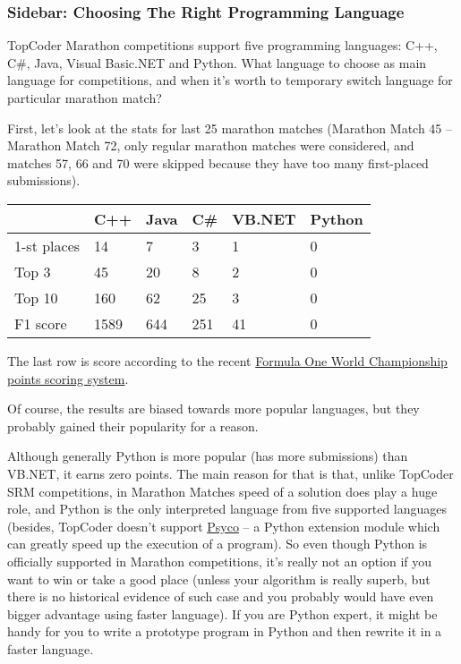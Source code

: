 \hypertarget{sidebar-choosing-the-right-programming-language}{%
\subsubsection{Sidebar: Choosing The Right Programming
Language}\label{sidebar-choosing-the-right-programming-language}}

TopCoder Marathon competitions support five programming languages: C++,
C\#, Java, Visual Basic.NET and Python. What language to choose as main
language for competitions, and when it's worth to temporary switch
language for particular marathon match?

First, let's look at the stats for last 25 marathon matches (Marathon
Match 45 -- Marathon Match 72, only regular marathon matches were
considered, and matches 57, 66 and 70 were skipped because they have too
many first-placed submissions).

\begin{longtable}[]{@{}llllll@{}}
\toprule
& C++ & Java & C\# & VB.NET & Python\tabularnewline
\midrule
\endhead
1-st places & 14 & 7 & 3 & 1 & 0\tabularnewline
Top 3 & 45 & 20 & 8 & 2 & 0\tabularnewline
Top 10 & 160 & 62 & 25 & 3 & 0\tabularnewline
F1 score & 1589 & 644 & 251 & 41 & 0\tabularnewline
\bottomrule
\end{longtable}

The last row is score according to the recent
\href{https://en.wikipedia.org/wiki/List_of_Formula_One_World_Championship_points_scoring_systems}{Formula
One World Championship points scoring system}.

Of course, the results are biased towards more popular languages, but
they probably gained their popularity for a reason.

Although generally Python is more popular (has more submissions) than
VB.NET, it earns zero points. The main reason for that is that, unlike
TopCoder SRM competitions, in Marathon Matches speed of a solution does
play a huge role, and Python is the only interpreted language from five
supported languages (besides, TopCoder doesn't support
\href{http://psyco.sourceforge.net}{Psyco} -- a Python extension module
which can greatly speed up the execution of a program). So even though
Python is officially supported in Marathon competitions, it's really not
an option if you want to win or take a good place (unless your algorithm
is really superb, but there is no historical evidence of such case and
you probably would have even bigger advantage using faster language). If
you are Python expert, it might be handy for you to write a prototype
program in Python and then rewrite it in a faster language.

